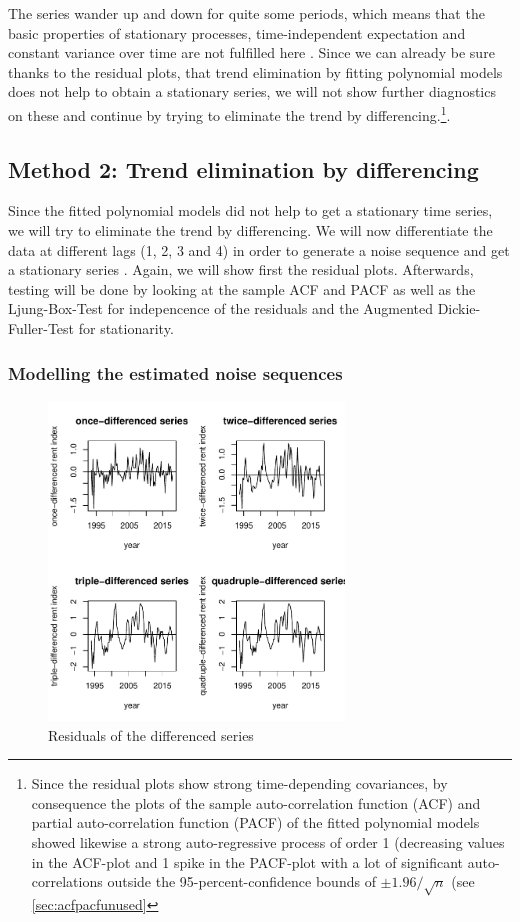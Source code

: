 \documentclass[11pt,a4paper]{article}
\begin{document}
The series wander up and down for quite some periods, which means that the basic properties of stationary processes, time-independent expectation and constant variance over time are not fulfilled here \cite[p.~49]{bd02}.
Since we can already be sure thanks to the residual plots, that trend elimination by fitting polynomial models does not help to obtain a stationary series, we will not show further diagnostics on these and continue by trying to eliminate the trend by differencing.\footnote{Since the residual plots show strong time-depending covariances, by consequence the plots of the sample auto-correlation function (ACF) and partial auto-correlation function (PACF) of the fitted polynomial models showed likewise a strong auto-regressive process of order 1 (decreasing values in the ACF-plot and 1 spike in the PACF-plot with a lot of significant auto-correlations outside the 95-percent-confidence bounds of $\pm 1.96/\sqrt{n}$ (see \cref{sec:acfpacfunused}}. 


\subsection{Method 2: Trend elimination by differencing}
Since the fitted polynomial models did not help to get a stationary time series, we will try to eliminate the trend by differencing.
We will now differentiate the data at different lags (1, 2, 3 and 4) in order to generate a noise sequence and get a stationary series \citep[p.~35]{bd02}.
Again, we will show first the residual plots. Afterwards, testing will be done by looking at the sample ACF and PACF as well as the Ljung-Box-Test for indepencence of the residuals and the Augmented Dickie-Fuller-Test for stationarity.


\subsubsection{Modelling the estimated noise sequences}

\begin{figure} [htb!]
    \centering
    \includegraphics[width=0.7\textwidth]{resid_diff_all}
    \caption{Residuals of the differenced series}
    \label{fig:resid_diff_all}
\end{figure}
\end{document}
